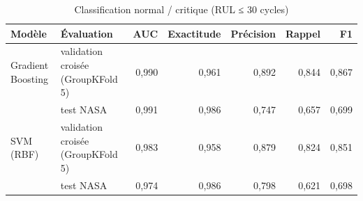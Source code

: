 \begin{table}[htbp]
\centering
\caption{Classification normal / critique (RUL ≤ 30 cycles)}
\label{tab:sante_classifieurs}
\begin{tabular}{llrrrrr}
\toprule
Modèle & Évaluation & AUC & Exactitude & Précision & Rappel & F1 \\
\midrule
Gradient Boosting & validation croisée (GroupKFold 5) & 0,990 & 0,961 & 0,892 & 0,844 & 0,867 \\
 & test NASA & 0,991 & 0,986 & 0,747 & 0,657 & 0,699 \\
SVM (RBF) & validation croisée (GroupKFold 5) & 0,983 & 0,958 & 0,879 & 0,824 & 0,851 \\
 & test NASA & 0,974 & 0,986 & 0,798 & 0,621 & 0,698 \\
\bottomrule
\end{tabular}
\end{table}

